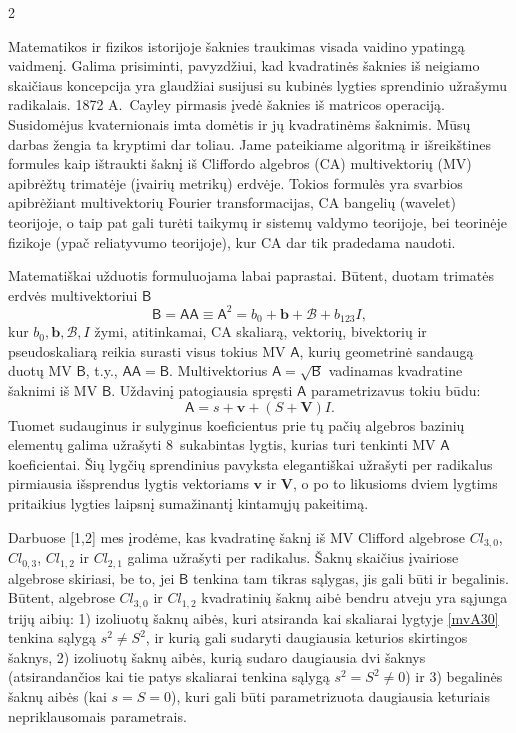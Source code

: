 \documentclass[a4paper,10pt,lithuanian]{article}
\def\A{\mathsf{A}}
\def\B{\mathsf{B}}
\newcommand{\cB}{\ensuremath{\mathcal{B}}}
\newcommand{\bv}{\ensuremath{\mathbf{v}}}
\newcommand{\bV}{\ensuremath{\mathbf{V}}}
\newcommand{\cl}[2]{\ensuremath{\mathit{Cl}_{#1,#2}}}
\begin{document}
\begin{multicols*}{2}

Matematikos ir fizikos istorijoje šaknies traukimas visada vaidino ypatingą vaidmenį. Galima prisiminti, pavyzdžiui, kad kvadratinės šaknies iš neigiamo skaičiaus koncepcija yra glaudžiai susijusi su kubinės lygties sprendinio užrašymu radikalais.  1872 A.~Cayley pirmasis įvedė šaknies iš matricos operaciją. Susidomėjus kvaternionais imta domėtis ir jų kvadratinėms šaknimis. Mūsų darbas žengia ta kryptimi dar toliau. Jame pateikiame algoritmą ir išreikštines formules kaip ištraukti šaknį iš Cliffordo algebros (CA) multivektorių (MV) apibrėžtų trimatėje (įvairių metrikų) erdvėje. Tokios formulės yra svarbios apibrėžiant multivektorių Fourier transformacijas, CA bangelių (wavelet) teorijoje, o taip pat gali turėti taikymų ir sistemų 
  valdymo teorijoje, bei teorinėje fizikoje (ypač reliatyvumo teorijoje), kur CA dar tik pradedama naudoti.



Matematiškai užduotis formuluojama labai paprastai. Būtent, duotam trimatės erdvės  multivektoriui $\B$
\begin{equation}\label{AA}
  \B=\A\A\equiv\A^2=b_0+\mathbf{b}+\cB+b_{123}I,
\end{equation}
kur $b_0, \mathbf{b}, \cB, I$ žymi, atitinkamai, CA skaliarą, vektorių, bivektorių ir pseudoskaliarą reikia surasti visus tokius MV $\A$, kurių geometrinė sandaugą duotų MV $\B$,  t.y., $\A \A=\B$. Multivektorius $\A=\sqrt{\B}$ vadinamas kvadratine šaknimi iš MV $\B$. Uždavinį patogiausia spręsti $\A$ parametrizavus tokiu būdu:
\begin{equation}
\A=s+\bv+(S+\bV)I.\label{mvA30}
\end{equation}
  Tuomet sudauginus ir sulyginus koeficientus prie tų pačių algebros bazinių elementų galima užrašyti 8~sukabintas lygtis, kurias turi tenkinti MV $\A$ koeficientai. Šių lygčių sprendinius pavyksta elegantiškai užrašyti per radikalus pirmiausia išsprendus lygtis vektoriams $\bv$ ir $\bV$, o po to likusioms dviem lygtims  pritaikius lygties laipsnį sumažinantį kintamųjų pakeitimą. 


Darbuose [1,2] mes įrodėme, kas kvadratinę šaknį iš MV Clifford algebrose \cl{3}{0}, \cl{0}{3}, \cl{1}{2} ir \cl{2}{1} galima užrašyti per radikalus. Šaknų skaičius įvairiose algebrose skiriasi, be to, jei $\B$ tenkina tam tikras sąlygas, jis gali būti ir begalinis. Būtent, algebrose  $\cl{3}{0}$ ir $\cl{1}{2}$ kvadratinių šaknų aibė bendru atveju yra sąjunga trijų aibių: 1) izoliuotų šaknų aibės, kuri atsiranda kai skaliarai lygtyje \eqref{mvA30} tenkina sąlygą $s^2\neq S^2$, ir kurią gali sudaryti daugiausia keturios skirtingos šaknys, 2) izoliuotų šaknų aibės, kurią sudaro daugiausia dvi šaknys (atsirandančios kai tie patys skaliarai tenkina sąlygą $s^2 =S^2\neq 0$) ir 3) begalinės šaknų aibės (kai $s=S=0$), kuri gali būti parametrizuota daugiausia keturiais nepriklausomais parametrais.  
  

\end{multicols*}
\end{document}
